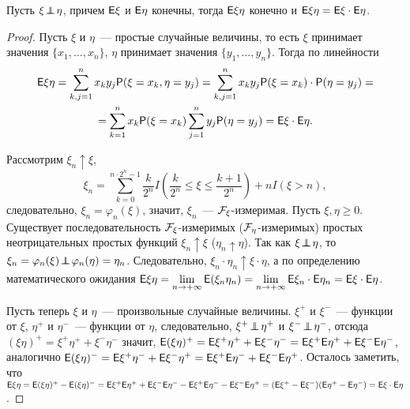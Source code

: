 \begin{theorem}
	Пусть $\xi \!\perp\!\!\!\!\perp\! \eta$, причем $\mathsf{E} \xi$ и $\mathsf{E} \eta$ конечны, тогда $\mathsf{E} \xi \eta$ конечно и $\mathsf{E} \xi \eta = \mathsf{E} \xi \cdot \mathsf{E} \eta$.
	\begin{proof}
		Пусть $\xi$ и $\eta$~--- простые случайные величины, то есть $\xi$ принимает значения $\{ x_1, \ldots, x_n \}$, $\eta$ принимает значения $\{ y_1, \ldots, y_n \}$. Тогда по линейности
		\begin{multline*}
			\mathsf{E} \xi \eta = \sum\limits_{k,j=1}^{n} x_k y_j \mathsf{P} (\xi = x_k, \eta = y_j) = \sum\limits_{k,j=1}^n x_k y_j \mathsf{P}(\xi = x_k) \cdot \mathsf{P}(\eta = y_j) = \\ = \sum\limits_{k = 1}^n x_k \mathsf{P} (\xi = x_k) \sum\limits_{j = 1}^{n} y_j \mathsf{P} (\eta = y_j) = \mathsf{E} \xi \cdot \mathsf{E} \eta.
		\end{multline*}
			
		Рассмотрим $\xi_n \uparrow \xi$, 
		$$\xi_n = \sum\limits_{k=0}^{n \cdot 2^n - 1} \dfrac{k}{2^n} I \left(\dfrac{k}{2^n} \leqslant \xi \leqslant \dfrac{k+1}{2^n} \right) + n I(\xi > n),$$
		 следовательно, $\xi_n = \varphi_n(\xi)$, значит, $\xi_n$~--- $\mathcal{F}_\xi$-измеримая. Пусть $\xi, \eta \geqslant 0$. Существует последовательность $\mathcal{F}_\xi$-измеримых ($\mathcal{F}_\eta$-измеримых) простых неотрицательных простых функций $\xi_n \uparrow \xi$ ($\eta_n \uparrow \eta$). Так как $\xi \!\perp\!\!\!\!\perp\! \eta$, то $\xi_n = \varphi_n (\xi) \!\perp\!\!\!\!\perp\! \varphi_n(\eta) = \eta_n$. Следовательно, $\xi_n \cdot \eta_n \uparrow \xi \cdot \eta$, а по определению математического ожидания $\mathsf{E} \xi\eta = \lim\limits_{n \rightarrow +\infty} \mathsf{E} (\xi_n \eta_n) =  \lim\limits_{n \rightarrow +\infty} \mathsf{E} \xi_n \cdot \mathsf{E} \eta_n = \mathsf{E} \xi \cdot \mathsf{E} \eta$.
			
		Пусть теперь $\xi$ и $\eta$~--- произвольные случайные величины. $\xi^+$ и $\xi^-$~--- функции от $\xi$, $\eta^+$ и $\eta^-$~--- функции от $\eta$, следовательно, $\xi^+ \!\perp\!\!\!\!\perp\! \eta^+$ и $\xi^- \!\perp\!\!\!\!\perp\! \eta^-$, отсюда $(\xi \eta)^+ = \xi^+ \eta^+ + \xi^- \eta^-$ значит, $\mathsf{E} (\xi \eta)^+ = \mathsf{E} \xi^+ \eta^+ + \mathsf{E} \xi^- \eta^- = \mathsf{E} \xi^+ \mathsf{E} \eta^+ + \mathsf{E} \xi^- \mathsf{E} \eta^-$, аналогично $\mathsf{E} (\xi \eta)^- = \mathsf{E} \xi^+ \eta^- + \mathsf{E} \xi^- \eta^+ = \mathsf{E} \xi^+ \mathsf{E} \eta^- + \mathsf{E} \xi^- \mathsf{E} \eta^+$. Осталось заметить, что $\mathsf{E} \xi \eta = \mathsf{E} (\xi \eta)^+ - \mathsf{E} ( \xi \eta)^- = \mathsf{E} \xi^+ \mathsf{E} \eta^+ + \mathsf{E} \xi^- \mathsf{E} \eta^- - \mathsf{E} \xi^+ \mathsf{E} \eta^- - \mathsf{E} \xi^- \mathsf{E} \eta^+ =  (\mathsf{E} \xi^+ - \mathsf{E} \xi^-) (\mathsf{E} \eta^+ - \mathsf{E} \eta^-) = \mathsf{E} \xi \cdot \mathsf{E} \eta$.
	\end{proof}
\end{theorem}
	
